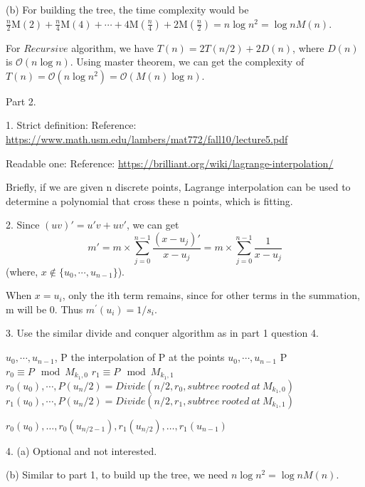 \documentclass{article}
\newcommand{\bigO}{\mathcal{O}}
\begin{document}
\begin{itemize}
(b) For building the tree, the time complexity would be $\frac{n}{2} \mathrm{M}(2)+\frac{n}{4} \mathrm{M}(4)+\cdots+4 \mathrm{M}\left(\frac{n}{4}\right)+2 \mathrm{M}\left(\frac{n}{2}\right) = n\log n^2= \log n M(n)$.

For $Recursive$ algorithm, we have $T (n) = 2T (n/2) + 2D(n)$, where $D(n)$ is  $\bigO(n\log n)$. Using master theorem, we can get the complexity of $T(n) = \bigO(n\log n^2) = \bigO(M(n)\log n)$.

Part 2.

1. 
Strict definition:
Reference: \url{https://www.math.usm.edu/lambers/mat772/fall10/lecture5.pdf}

Readable one:
Reference: \url{https://brilliant.org/wiki/lagrange-interpolation/}

Briefly, if we are given n discrete points, Lagrange interpolation can be used to determine a polynomial that cross these n points, which is fitting.

2. Since $(uv)' = u'v + uv'$, we can get $$m' = m\times \sum_{j=0}^{n-1} \frac{(x-u_j)'}{x-u_j} = m\times \sum_{j=0}^{n-1}\frac{1}{x-u_j}$$(where, $x\not \in \{u_0, \cdots, u_{n-1} \}$). 

When $x=u_i$, only the ith term remains, since for other terms in the summation, m will be 0. Thus $m^{\prime}\left(u_{i}\right)=1 / s_{i}$.

3. Use the similar divide and conquer algorithm as in part 1 question 4.
\begin{algorithm}[H]  
    \caption{$Divide$}  
    \begin{algorithmic}[1]  
        \Require $u_0, \cdots, u_{n-1}$, P
        \Ensure the interpolation of P at the points $u_0, \cdots, u_{n-1}$
        	\State \Return P
        \EndIf
        \State $r_0 \equiv P \mod M_{k_1, 0}$
		\State $r_1 \equiv P \mod M_{k_1, 1}$
        \State $r_0(u_0), \cdots, P(u_n/2) = Divide(n/2, r_0, subtree\ rooted\ at\ M_{k_1, 0})$
        \State $r_1(u_0), \cdots, P(u_n/2) = Divide(n/2, r_1, subtree\ rooted\ at\ M_{k_1, 1})$
        
        \State \Return $r_{0}\left(u_{0}\right), \ldots, r_{0}\left(u_{n / 2-1}\right), r_{1}\left(u_{n / 2}\right), \ldots, r_{1}\left(u_{n-1}\right)$

    \end{algorithmic}  
\end{algorithm}

4. (a) Optional and not interested.

(b) Similar to part 1, to build up the tree, we need $n\log n^2= \log n M(n)$.


\end{itemize}
\end{document}
